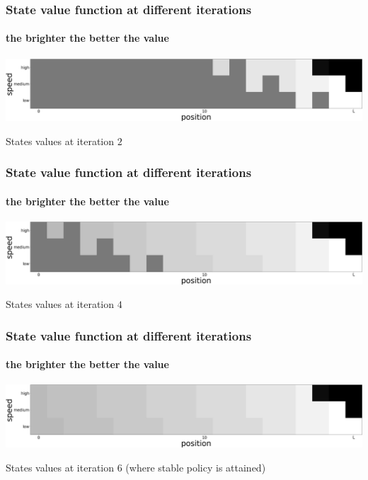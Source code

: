 \documentclass[dvipsnames,svgnames]{beamer}
\begin{document}
\begin{frame}
\frametitle{State value function at different iterations}
\framesubtitle{the brighter the better the value}
\centering
\includegraphics[scale=0.12]{img/value2.jpg}\\
\begin{block}{}
\centering
States values at iteration $2$ 
\end{block}
\end{frame}


\begin{frame}
\frametitle{State value function at different iterations}
\framesubtitle{the brighter the better the value}

\centering
\includegraphics[scale=0.12]{img/value4.jpg}\\
\begin{block}{}
\centering
States values at iteration $4$ 
\end{block}
\end{frame}

\begin{frame}
\frametitle{State value function at different iterations}
\framesubtitle{the brighter the better the value}

\centering
\includegraphics[scale=0.12]{img/value6.jpg}\\
\begin{block}{}
\centering
States values at iteration $6$ (where stable policy is attained)
\end{block}

\end{frame}
\end{document}
